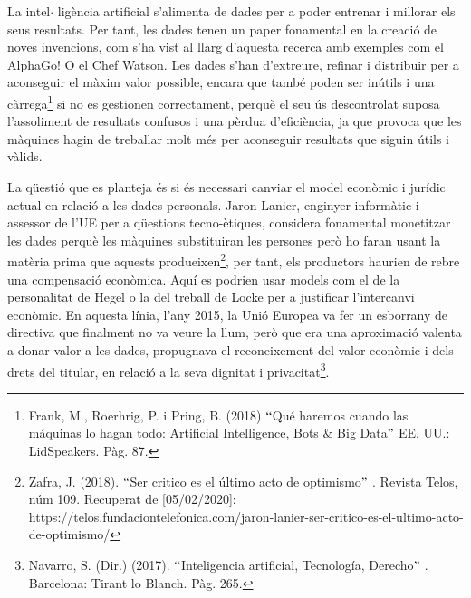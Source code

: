 \documentclass[12pt]{article}
\begin{document}
\vspace{\baselineskip}
\begin{justify}
La intel$ \cdot $ ligència artificial s’alimenta de dades per a poder entrenar i millorar els seus resultats. Per tant, les dades tenen un paper fonamental en la creació de noves invencions, com s’ha vist al llarg d’aquesta recerca amb exemples com el AlphaGo! O el Chef Watson. Les dades s’han d’extreure, refinar i distribuir per a aconseguir el màxim valor possible, encara que també poden ser inútils i una càrrega\footnote{ Frank, M., Roerhrig, P. i Pring, B. (2018) $``$Qué haremos cuando las máquinas lo hagan todo: Artificial Intelligence, Bots $\&$  Big Data$"$  EE. UU.: LidSpeakers. Pàg. 87. } si no es gestionen correctament, perquè el seu ús descontrolat suposa l’assoliment de resultats confusos i una pèrdua d’eficiència, ja que provoca que les màquines hagin de treballar molt més per aconseguir resultats que siguin útils i vàlids.
\end{justify}\par


\vspace{\baselineskip}
\begin{justify}
La qüestió que es planteja és si és necessari canviar el model econòmic i jurídic actual en relació a les dades personals. Jaron Lanier, enginyer informàtic i assessor de l’UE per a qüestions tecno-ètiques, considera fonamental monetitzar les dades perquè les màquines substituiran les persones però ho faran usant la matèria prima que aquests produeixen\footnote{ Zafra, J. (2018). $``$Ser critico es el último acto de optimismo$"$ . Revista Telos, núm 109. Recuperat de [05/02/2020]: https://telos.fundaciontelefonica.com/jaron-lanier-ser-critico-es-el-ultimo-acto-de-optimismo/ }, per tant, els productors haurien de rebre una compensació econòmica. Aquí es podrien usar models com el de la personalitat de Hegel o la del treball de Locke per a justificar l’intercanvi econòmic. En aquesta línia, l’any 2015, la Unió Europea va fer un esborrany de directiva que finalment no va veure la llum, però que era una aproximació valenta a donar valor a les dades, propugnava el reconeixement del valor econòmic i dels drets del titular, en relació a la seva dignitat i privacitat\footnote{ Navarro, S. (Dir.) (2017). $``$Inteligencia artificial, Tecnología, Derecho$"$ . Barcelona: Tirant lo Blanch. Pàg. 265.  }.
\end{justify}\par
\end{document}
